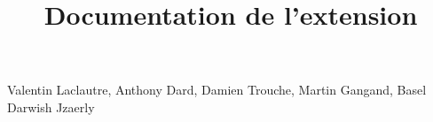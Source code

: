 \documentclass[12pt, a4paper, one side]{article}
\title{Documentation de l'extension}
\author{}
\date{}
\begin{document}
\maketitle

\begin{center}
    Valentin Laclautre, Anthony Dard, Damien Trouche, Martin Gangand, Basel Darwish Jzaerly
\end{center}

\tableofcontents
\end{document}
